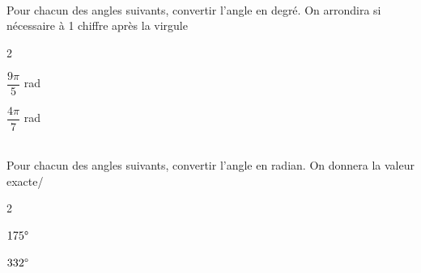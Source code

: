 \documentclass[a4paper,12pt]{article}        %
\begin{document}
\\
Pour chacun des angles suivants, convertir l'angle en degré. On arrondira si nécessaire à 1 chiffre après la virgule
\begin{multicols}{2}
	\begin{enumMet}
		\item $\dfrac{9\pi}{5}$ rad
		\item $\dfrac{4\pi}{7}$ rad
	\end{enumMet}
\end{multicols}

\\
Pour chacun des angles suivants, convertir l'angle en radian. On donnera la valeur exacte/
\begin{multicols}{2}
	\begin{enumMet}
		\item $175\degree$
		\item $332\degree$
	\end{enumMet}
\end{multicols}
\end{document}
